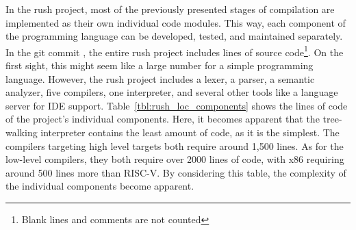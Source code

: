 In the rush project, most of the previously presented stages of compilation are implemented as their own individual code modules.
This way, each component of the programming language can be developed, tested, and maintained separately.
In the git commit \rushCommit, the entire rush project includes
 lines of source code\footnote{Blank lines and comments are not counted}.
On the first sight, this might seem like a large number for a simple programming language.
However, the rush project includes a lexer, a parser, a semantic analyzer, five compilers, one interpreter, and several other tools like a language server for IDE support.
Table~\ref{tbl:rush_loc_components} shows the lines of code of the project's individual components.
Here, it becomes apparent that the tree-walking interpreter contains the least amount of code, as it is the simplest.
The compilers targeting high level targets both require around 1,500 lines.
As for the low-level compilers, they both require over 2000 lines of code, with x86 requiring around 500 lines more than RISC-V.
By considering this table, the complexity of the individual components become apparent.
